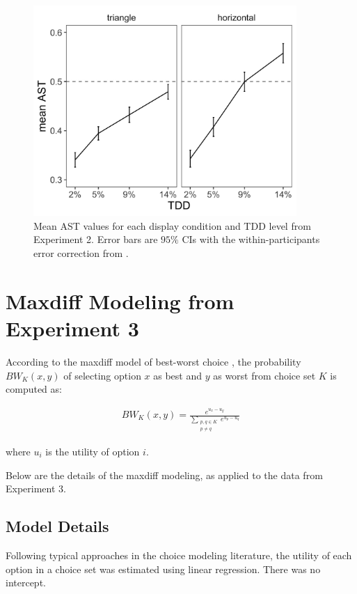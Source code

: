\begin{figure}
   \includegraphics[width=100mm]{figures/choicePhase_mean_ast.jpeg}
   \caption{Mean AST values for each display condition and TDD level from Experiment 2. Error bars are $95\%$ CIs with the within-participants error correction from \textcite{cousineau2014error}.}
   \label{fig:e2_ast}
\end{figure}

\chapter{Maxdiff Modeling from Experiment 3}
According to the maxdiff model of best-worst choice \parencite{marleyProbabilisticModelsBest2005}, the probability $BW_{K}(x,y)$ of selecting option $x$ as best and $y$ as worst from choice set $K$ is computed as:

\begin{equation}
   \begin{aligned}
   BW_{K}(x,y)=\frac{e^{u_{x}-u_{y}}}{\sum_{\substack{{p,q}\in K\\p \neq q}} e^{u_{p}-u_{q}}}   
   \label{eqn:maxdiff_equation1}
   \end{aligned}
\end{equation}

where $u_{i}$ is the utility of option $i$. 

Below are the details of the maxdiff modeling, as applied to the data from Experiment 3.

\section{Model Details}
Following typical approaches in the choice modeling literature, the utility of each option in a choice set was estimated using linear regression. There was no intercept.

